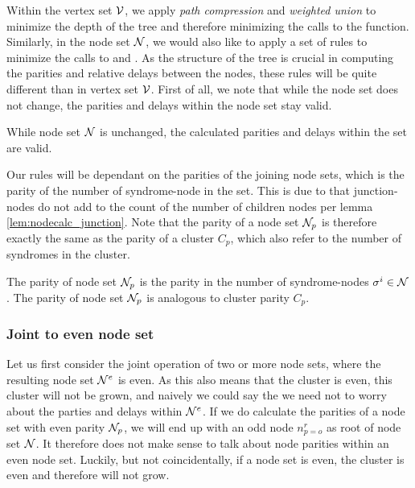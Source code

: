 Within the vertex set $\mathcal{V}$, we apply \emph{path compression} and \emph{weighted union} to minimize the depth of the tree and therefore minimizing the calls to the  function. Similarly, in the node set $\mathcal{N}$, we would also like to apply a set of rules to minimize the calls to  and . As the structure of the tree is crucial in computing the parities and relative delays between the nodes, these rules will be quite different than in vertex set $\mathcal{V}$. First of all, we note that while the node set does not change, the parities and delays within the node set stay valid. 

\begin{lemma}\label{lem:nodesetunchanged}
  While node set $\mathcal{N}$ is unchanged, the calculated parities and delays within the set are valid. 
\end{lemma}

Our rules will be dependant on the parities of the joining node sets, which is the parity of the number of syndrome-node in the set. This is due to that junction-nodes do not add to the count of the number of children nodes per lemma \ref{lem:nodecalc_junction}. Note that the parity of a node set $\mathcal{N}_p$ is therefore exactly the same as the parity of a cluster $C_p$, which also refer to the number of syndromes in the cluster.

\begin{lemma}
  The parity of node set $\mathcal{N}_p$ is the parity in the number of syndrome-nodes $\sigma^i \in \mathcal{N}$. The parity of node set $\mathcal{N}_p$ is analogous to cluster parity $C_p$.
\end{lemma}

\subsubsection{Joint to even node set}

Let us first consider the joint operation of two or more node sets, where the resulting node set $\mathcal{N}^{e}$ is even. As this also means that the cluster is even, this cluster will not be grown, and naively we could say the we need not to worry about the parties and delays within $\mathcal{N}^{e}$. If we do calculate the parities of a node set with even parity $\mathcal{N}_p$, we will end up with an odd node $n^r_{p=o}$ as root of node set $\mathcal{N}$. It therefore does not make sense to talk about node parities within an even node set. Luckily, but not coincidentally, if a node set is even, the cluster is even and therefore will not grow.

